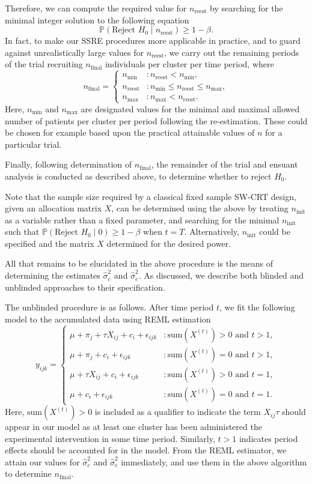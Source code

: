 \documentclass{article}
\begin{document}
Therefore, we can compute the required value for $n_\text{reest}$ by searching for the minimal integer solution to the following equation
\[ \mathbb{P}(\text{Reject } H_0 \mid n_\text{reest})\ge 1-\beta.\]
In fact, to make our SSRE procedures more applicable in practice, and to guard against unrealistically large values for $n_\text{reest}$, we carry out the remaining periods of the trial recruiting $n_\text{final}$ individuals per cluster per time period, where
\[ n_\text{final}=\begin{cases}
n_\text{min} &: n_\text{reest} < n_\text{min},\\
n_\text{reest} &: n_\text{min} \le n_\text{reest} \le n_\text{max},\\
n_\text{max} &: n_\text{max} < n_\text{reest}.
\end{cases} \]
Here, $n_\text{min}$ and $n_\text{max}$ are designated values for the minimal and maximal allowed number of patients per cluster per period following the re-estimation. These could be chosen for example based upon the practical attainable values of $n$ for a particular trial.

Finally, following determination of $n_\text{final}$, the remainder of the trial and ensuant analysis is conducted as described above, to determine whether to reject $H_0$.

Note that the sample size required by a classical fixed sample SW-CRT design, given an allocation matrix $X$, can be determined using the above by treating $n_\text{init}$ as a variable rather than a fixed parameter, and searching for the minimal $n_\text{init}$ such that $\mathbb{P}(\text{Reject } H_0 \mid 0)\ge 1-\beta$ when $t=T$. Alternatively, $n_\text{init}$ could be specified and the matrix $X$ determined for the desired power.

All that remains to be elucidated in the above procedure is the means of determining the estimates $\hat{\sigma}_c^2$ and $\hat{\sigma}_e^2$. As discussed, we describe both blinded and unblinded approaches to their specification.

The unblinded procedure is as follows. After time period $t$, we fit the following model to the accumulated data using REML estimation
\[ y_{ijk}=\begin{cases}
\mu + \pi_j + \tau X_{ij} + c_i + \epsilon_{ijk} &: \text{sum}(X^{(t)})>0 \text{ and } t>1,\\
\mu + \pi_j + c_i + \epsilon_{ijk} &: \text{sum}(X^{(t)})=0 \text{ and } t>1,\\
\mu + \tau X_{ij} + c_i + \epsilon_{ijk} &: \text{sum}(X^{(t)})>0 \text{ and } t=1,\\
\mu + c_i + \epsilon_{ijk} &: \text{sum}(X^{(t)})=0 \text{ and } t=1.
\end{cases} \]
Here, $\text{sum}(X^{(t)})>0$ is included as a qualifier to indicate the term $X_{ij}\tau$ should appear in our model as at least one cluster has been administered the experimental intervention in some time period. Similarly, $t>1$ indicates period effects should be accounted for in the model. From the REML estimator, we attain our values for $\hat{\sigma}_c^2$ and $\hat{\sigma}_e^2$ immediately, and use them in the above algorithm to determine $n_\text{final}$.
\end{document}
